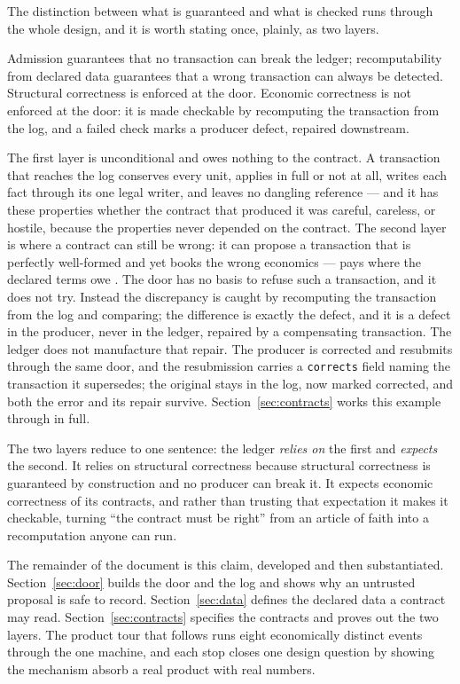 The distinction between what is guaranteed and what is checked runs through the
whole design, and it is worth stating once, plainly, as two layers.

\begin{principle}\label{prin:two-layer}
Admission guarantees that no transaction can break the ledger; recomputability
from declared data guarantees that a wrong transaction can always be detected.
Structural correctness is enforced at the door. Economic correctness is not
enforced at the door: it is made checkable by recomputing the transaction from the
log, and a failed check marks a producer defect, repaired downstream.
\end{principle}

The first layer is unconditional and owes nothing to the contract. A transaction
that reaches the log conserves every unit, applies in full or not at all, writes
each fact through its one legal writer, and leaves no dangling reference --- and
it has these properties whether the contract that produced it was careful,
careless, or hostile, because the properties never depended on the contract. The
second layer is where a contract can still be wrong: it can propose a transaction
that is perfectly well-formed and yet books the wrong economics --- pays
 where the declared terms owe . The door has no basis to refuse
such a transaction, and it does not try. Instead the discrepancy is caught by
recomputing the transaction from the log and comparing; the difference is exactly
the defect, and it is a defect in the producer, never in the ledger, repaired by
a compensating transaction. The ledger does not manufacture that repair. The
producer is corrected and resubmits through the same door, and the resubmission
carries a \texttt{corrects} field naming the transaction it supersedes; the
original stays in the log, now marked corrected, and both the error and its repair
survive. Section~\ref{sec:contracts} works this example through in full.

The two layers reduce to one sentence: the ledger \emph{relies on} the first and
\emph{expects} the second. It relies on
structural correctness because structural correctness is guaranteed by
construction and no producer can break it. It expects economic correctness of its
contracts, and rather than trusting that expectation it makes it checkable,
turning ``the contract must be right'' from an article of faith into a
recomputation anyone can run.

The remainder of the document is this claim, developed and then substantiated.
Section~\ref{sec:door} builds the door and the log and shows why an untrusted
proposal is safe to record. Section~\ref{sec:data} defines the declared data a
contract may read. Section~\ref{sec:contracts} specifies the contracts and proves
out the two layers. The product tour that follows runs eight economically
distinct events through the one machine, and each stop closes one design question
by showing the mechanism absorb a real product with real numbers.
